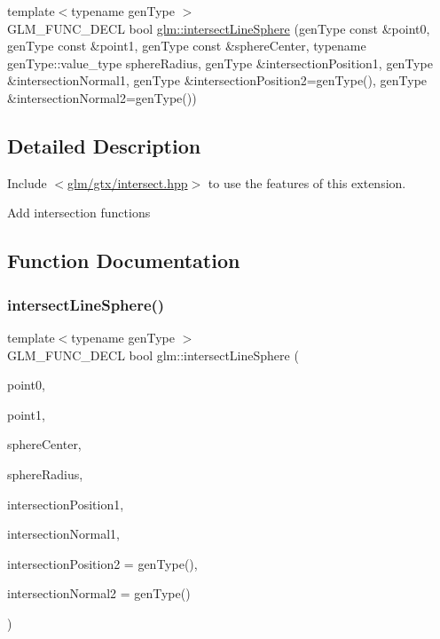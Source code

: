 \begin{DoxyCompactItemize}
\item 
{\footnotesize template$<$typename gen\+Type $>$ }\\G\+L\+M\+\_\+\+F\+U\+N\+C\+\_\+\+D\+E\+CL bool \hyperlink{group__gtx__intersect_ga9c68139f3d8a4f3d7fe45f9dbc0de5b7}{glm\+::intersect\+Line\+Sphere} (gen\+Type const \&point0, gen\+Type const \&point1, gen\+Type const \&sphere\+Center, typename gen\+Type\+::value\+\_\+type sphere\+Radius, gen\+Type \&intersection\+Position1, gen\+Type \&intersection\+Normal1, gen\+Type \&intersection\+Position2=gen\+Type(), gen\+Type \&intersection\+Normal2=gen\+Type())
\end{DoxyCompactItemize}


\subsection{Detailed Description}
Include $<$\hyperlink{intersect_8hpp}{glm/gtx/intersect.\+hpp}$>$ to use the features of this extension.

Add intersection functions 

\subsection{Function Documentation}
\mbox{\label{group__gtx__intersect_ga9c68139f3d8a4f3d7fe45f9dbc0de5b7}} 
\subsubsection{\texorpdfstring{intersect\+Line\+Sphere()}{intersectLineSphere()}}
{\footnotesize\ttfamily template$<$typename gen\+Type $>$ \\
G\+L\+M\+\_\+\+F\+U\+N\+C\+\_\+\+D\+E\+CL bool glm\+::intersect\+Line\+Sphere (\begin{DoxyParamCaption}\item[{gen\+Type const \&}]{point0,  }\item[{gen\+Type const \&}]{point1,  }\item[{gen\+Type const \&}]{sphere\+Center,  }\item[{typename gen\+Type\+::value\+\_\+type}]{sphere\+Radius,  }\item[{gen\+Type \&}]{intersection\+Position1,  }\item[{gen\+Type \&}]{intersection\+Normal1,  }\item[{gen\+Type \&}]{intersection\+Position2 = {\ttfamily genType()},  }\item[{gen\+Type \&}]{intersection\+Normal2 = {\ttfamily genType()} }\end{DoxyParamCaption})}



